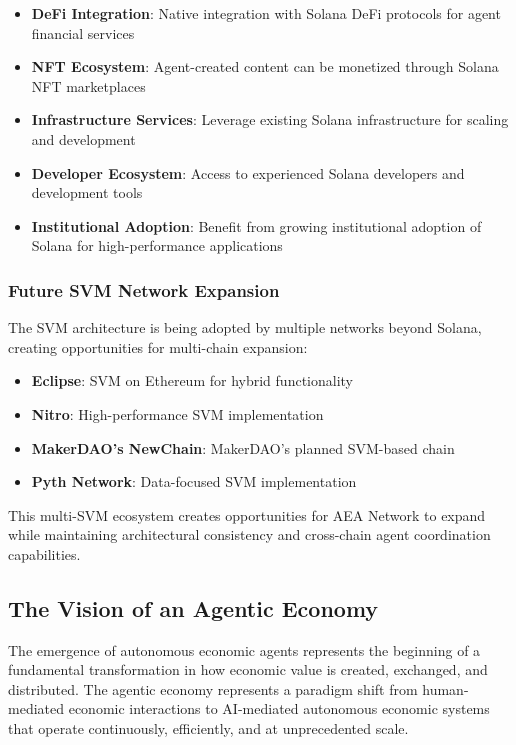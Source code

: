 \documentclass[12pt,a4paper]{article}
\begin{document}
\begin{itemize}
\item \textbf{DeFi Integration}: Native integration with Solana DeFi protocols for agent financial services
\item \textbf{NFT Ecosystem}: Agent-created content can be monetized through Solana NFT marketplaces
\item \textbf{Infrastructure Services}: Leverage existing Solana infrastructure for scaling and development
\item \textbf{Developer Ecosystem}: Access to experienced Solana developers and development tools
\item \textbf{Institutional Adoption}: Benefit from growing institutional adoption of Solana for high-performance applications
\end{itemize}

\subsubsection{Future SVM Network Expansion}

The SVM architecture is being adopted by multiple networks beyond Solana, creating opportunities for multi-chain expansion:

\begin{itemize}
\item \textbf{Eclipse}: SVM on Ethereum for hybrid functionality
\item \textbf{Nitro}: High-performance SVM implementation
\item \textbf{MakerDAO's NewChain}: MakerDAO's planned SVM-based chain
\item \textbf{Pyth Network}: Data-focused SVM implementation
\end{itemize}

This multi-SVM ecosystem creates opportunities for AEA Network to expand while maintaining architectural consistency and cross-chain agent coordination capabilities.

\subsection{The Vision of an Agentic Economy}

The emergence of autonomous economic agents represents the beginning of a fundamental transformation in how economic value is created, exchanged, and distributed. The agentic economy represents a paradigm shift from human-mediated economic interactions to AI-mediated autonomous economic systems that operate continuously, efficiently, and at unprecedented scale.
\end{document}
